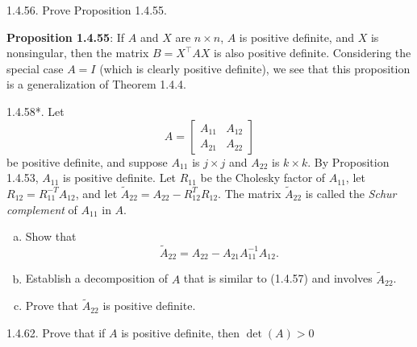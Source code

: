 \documentclass{report}
\begin{document}
    \pagebreak  \bigbreak \noindent 
    \begin{mdframed}
        1.4.56. Prove Proposition 1.4.55. 
    \end{mdframed}
    \bigbreak \noindent 
    \textbf{Proposition 1.4.55}: If $A$ and $X$ are $n\times n$, $A$ is positive definite, and $X$ is nonsingular,
    then the matrix $B = X^{\top} A X$ is also positive definite.
    \bigbreak \noindent 
    Considering the special case $A = I$ (which is clearly positive definite), we see that
    this proposition is a generalization of Theorem 1.4.4.

    \pagebreak \bigbreak \noindent 
    \begin{mdframed}
        1.4.58*.
        Let 
        \[
            A = 
            \begin{bmatrix}
                A_{11} & A_{12} \\
                A_{21} & A_{22}
            \end{bmatrix}
        \]
        be positive definite, and suppose $A_{11}$ is $j \times j$ and 
        $A_{22}$ is $k \times k$. By Proposition 1.4.53, $A_{11}$ is positive definite. 
        Let $R_{11}$ be the Cholesky factor of $A_{11}$, let $R_{12} = R_{11}^{-T} A_{12}$, 
        and let $\tilde{A}_{22} = A_{22} - R_{12}^{T} R_{12}$. The matrix $\tilde{A}_{22}$ is 
        called the \emph{Schur complement} of $A_{11}$ in $A$.
        \begin{enumerate}[(a)]
            \item Show that 
                \[
                    \tilde{A}_{22} = A_{22} - A_{21} A_{11}^{-1} A_{12}.
                \]
            \item Establish a decomposition of $A$ that is similar to (1.4.57) and involves $\tilde{A}_{22}$.
            \item Prove that $\tilde{A}_{22}$ is positive definite.
        \end{enumerate}
    \end{mdframed}

    \pagebreak \bigbreak \noindent 
    \begin{mdframed}
        1.4.62. Prove that if $A$ is positive definite, then $\det(A) > 0$
    \end{mdframed}
\end{document}
